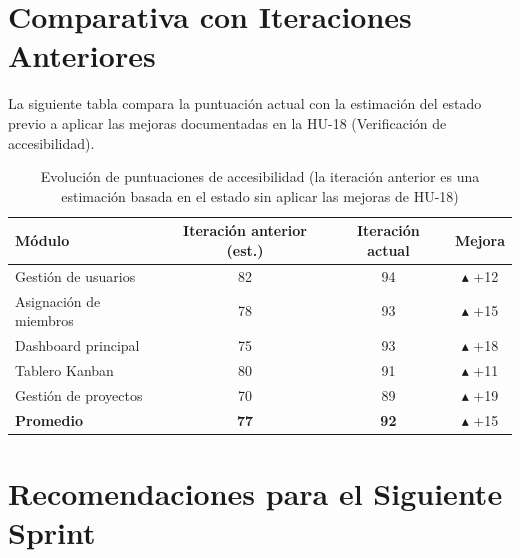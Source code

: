 \documentclass[12pt, a4paper]{article}
\newcommand{\up}[1]{\textcolor{accentgreen}{$\blacktriangle$ +#1}}
\begin{document}
\section{Comparativa con Iteraciones Anteriores}

La siguiente tabla compara la puntuación actual con la estimación del estado previo a
aplicar las mejoras documentadas en la HU-18 (Verificación de accesibilidad).

\begin{table}[H]
\centering
\renewcommand{\arraystretch}{1.5}
\begin{tabularx}{\linewidth}{Xccc}
\toprule
\rowcolor{lightblue}
\textbf{Módulo} & \textbf{Iteración anterior (est.)} & \textbf{Iteración actual} & \textbf{Mejora} \\
\midrule
Gestión de usuarios          & 82 & 94 & \up{12} \\
Asignación de miembros       & 78 & 93 & \up{15} \\
Dashboard principal          & 75 & 93 & \up{18} \\
Tablero Kanban               & 80 & 91 & \up{11} \\
Gestión de proyectos         & 70 & 89 & \up{19} \\
\midrule
\rowcolor{scoreok}
\textbf{Promedio}            & \textbf{77} & \textbf{92} & \up{15} \\
\bottomrule
\end{tabularx}
\caption{Evolución de puntuaciones de accesibilidad (la iteración anterior es una estimación
basada en el estado sin aplicar las mejoras de HU-18)}
\end{table}

\section{Recomendaciones para el Siguiente Sprint}
\end{document}
